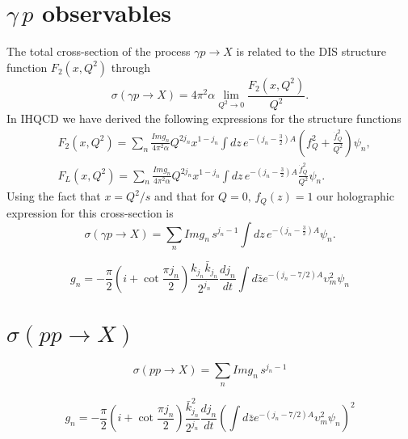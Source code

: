 \documentclass[preprint, 12pt]{elsarticle}
\begin{document}
\section{$\gamma\, p$ observables}

The total cross-section of the process $\gamma p \rightarrow X$ is related to the DIS structure function $F_2\left(x, Q^2\right)$ through
\begin{equation}
\sigma\left(\gamma p \rightarrow X\right) = 4 \pi^2 \alpha \lim_{Q^2 \rightarrow 0} \frac{F_2\left(x, Q^2\right)}{Q^2}.
\end{equation}
In IHQCD we have derived the following expressions for the structure functions
\begin{align}
&F_2(x, Q^2) = \sum_{n} \frac{ Im g_n}{4 \pi^2 \alpha} Q^{2 j_n} x^{1-j_n} \int dz \,e^{-\left(j_n-\frac{3}{2}\right)A}  \left( f_Q^2  +  \frac{\dot{f}_Q^{2}}{Q^2}      \right) \psi_n , \\
&F_L(x, Q^2) = \sum_{n} \frac{Im g_n}{4 \pi^2 \alpha} Q^{2 j_n} x^{1-j_n} \int dz \,e^{-\left(j_n-\frac{3}{2}\right)A}  \frac{\dot{f}_Q^{2}}{Q^2}  \psi_n.
\end{align}
Using the fact that $x = Q^2 / s$ and that for $Q = 0, \, f_Q\left(z\right) = 1$ our holographic expression for this cross-section is
\begin{equation}
\sigma\left(\gamma p \rightarrow X\right) =  \sum_{n} Im g_n \, s^{j_n -1 } \int dz \,e^{-\left(j_n-\frac{3}{2}\right)A}  \psi_n.
\end{equation}

\begin{equation}
g_n = - \frac{\pi}{2} \left( i + \cot \frac{\pi j_n}{2} \right) \frac{k_{j_n} \bar{k}_{j_n}}{2^{j_n}} \frac{d j_n}{dt} \int d\bar{z} e^{-\left(j_n - 7/2 \right)A} \upsilon_m^2 \psi_n
\end{equation}

\section{$\sigma\left(p p \rightarrow X\right)$}

\begin{equation}
\sigma\left(p p \rightarrow X\right) = \sum_n Im g_n \, s^{j_n -1}
\end{equation}

\begin{equation}
g_n = - \frac{\pi}{2} \left( i + \cot \frac{\pi j_n}{2} \right) \frac{\bar{k}^2_{j_n}}{2^{j_n}} \frac{d j_n}{dt} {\left(\int d\bar{z} e^{-\left(j_n - 7/2 \right)A} \upsilon_m^2 \psi_n\right)}^2
\label{eq:pp_fit_constant}
\end{equation}
\end{document}
